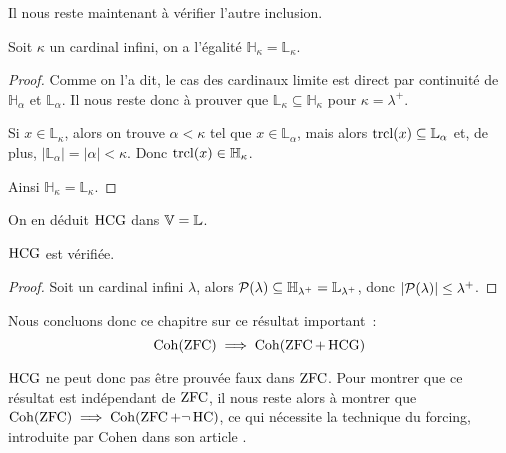 Il nous reste maintenant à vérifier l'autre inclusion.

\begin{lemma}
  Soit $\kappa$ un cardinal infini, on a l'égalité
  $\mathbb H_\kappa = \mathbb L_\kappa$.
\end{lemma}

\begin{proof}
  Comme on l'a dit, le cas des cardinaux limite est direct par continuité de
  $\mathbb H_\alpha$ et $\mathbb L_\alpha$. Il nous reste donc à prouver que
  $\mathbb L_\kappa\subseteq \mathbb H_\kappa$ pour $\kappa = \lambda^+$.

  Si $x\in \mathbb L_\kappa$, alors on trouve $\alpha < \kappa$ tel que
  $x\in \mathbb L_\alpha$, mais alors $\operatorname{trcl}(x)\subseteq \mathbb L_\alpha$ et, de
  plus, $|\mathbb L_\alpha| = |\alpha| < \kappa$.
  Donc $\operatorname{trcl}(x)\in\mathbb H_\kappa$.

  Ainsi $\mathbb H_\kappa = \mathbb L_\kappa$.
\end{proof}

On en déduit $\operatorname{HCG}$ dans $\mathbb V = \mathbb L$.

\begin{theorem}
  $\operatorname{HCG}$ est vérifiée.
\end{theorem}

\begin{proof}
  Soit un cardinal infini $\lambda$, alors
  $\mathcal{P}(\lambda) \subseteq \mathbb H_{\lambda^+} = \mathbb L_{\lambda^+}$,
  donc $|\mathcal{P}(\lambda)| \leq \lambda^+$.
\end{proof}

Nous concluons donc ce chapitre sur ce résultat important~:
\[\operatorname{Coh}(\operatorname{ZFC}) \implies \operatorname{Coh}(\operatorname{ZFC} + \operatorname{HCG})\]

$\operatorname{HCG}$ ne peut donc pas être prouvée faux dans $\operatorname{ZFC}$. Pour montrer que ce
résultat est indépendant de $\operatorname{ZFC}$, il nous reste alors à montrer que
$\operatorname{Coh}(\operatorname{ZFC})\implies\operatorname{Coh}(\operatorname{ZFC}+\lnot\operatorname{HC})$, ce qui nécessite la technique du
forcing, introduite par Cohen dans son article
\cite{doi:10.1073/pnas.50.6.1143}.
